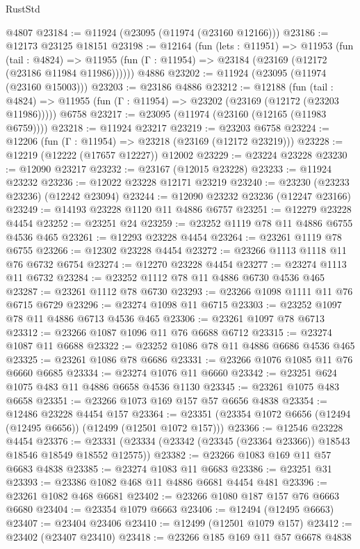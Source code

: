 \begin{lexlean}{RustStd}
\begin{coremodule}
{\begin{coremodule}
{{{{{{{{{{{{{{{{{{{{{{{{{{{{{{{{{{{{{{{{{{{{{{{{{{{{{{{{{{{{{{{{{{{{{{{{{{{{{{{{    @4807
@23184 := @11924 (@23095 (@11974 (@23160 @12166)))
@23186 := @12173 @23125 @18151
@23198 := @12164
    (fun (lets : @11951) =>
    @11953
      (fun (tail : @4824) =>
      @11955 (fun (Γ : @11954) => @23184 (@23169 (@12172 (@23186 @11984 @11986))))))
    @4886
@23202 := @11924 (@23095 (@11974 (@23160 @15003)))
@23203 := @23186 @4886
@23212 := @12188
    (fun (tail : @4824) => @11955 (fun (Γ : @11954) => @23202 (@23169 (@12172 (@23203 @11986)))))
    @6758
@23217 := @23095 (@11974 (@23160 (@12165 (@11983 @6759))))
@23218 := @11924 @23217
@23219 := @23203 @6758
@23224 := @12206 (fun (Γ : @11954) => @23218 (@23169 (@12172 @23219)))
@23228 := @12219 (@12222 (@17657 @12227)) @12002
@23229 := @23224 @23228
@23230 := @12090 @23217
@23232 := @23167 (@12015 @23228)
@23233 := @11924 @23232
@23236 := @12022 @23228 @12171 @23219
@23240 := @23230 (@23233 @23236) (@12242 @23094)
@23244 := @12090 @23232 @23236 (@12247 @23166)
@23249 := @14193 @23228 @1120 @11 @4886 @6757
@23251 := @12279 @23228 @4454
@23252 := @23251 @24
@23259 := @23252 @1119 @78 @11 @4886 @6755 @4536 @465
@23261 := @12293 @23228 @4454
@23264 := @23261 @1119 @78 @6755
@23266 := @12302 @23228 @4454
@23272 := @23266 @1113 @1118 @11 @76 @6732 @6754
@23274 := @12270 @23228 @4454
@23277 := @23274 @1113 @11 @6732
@23284 := @23252 @1112 @78 @11 @4886 @6730 @4536 @465
@23287 := @23261 @1112 @78 @6730
@23293 := @23266 @1098 @1111 @11 @76 @6715 @6729
@23296 := @23274 @1098 @11 @6715
@23303 := @23252 @1097 @78 @11 @4886 @6713 @4536 @465
@23306 := @23261 @1097 @78 @6713
@23312 := @23266 @1087 @1096 @11 @76 @6688 @6712
@23315 := @23274 @1087 @11 @6688
@23322 := @23252 @1086 @78 @11 @4886 @6686 @4536 @465
@23325 := @23261 @1086 @78 @6686
@23331 := @23266 @1076 @1085 @11 @76 @6660 @6685
@23334 := @23274 @1076 @11 @6660
@23342 := @23251 @624 @1075 @483 @11 @4886 @6658 @4536 @1130
@23345 := @23261 @1075 @483 @6658
@23351 := @23266 @1073 @169 @157 @57 @6656 @4838
@23354 := @12486 @23228 @4454 @157
@23364 := @23351 (@23354 @1072 @6656 (@12494 (@12495 @6656)) (@12499 (@12501 @1072 @157)))
@23366 := @12546 @23228 @4454
@23376 := @23331 (@23334 (@23342 (@23345 (@23364 @23366)) @18543 @18546 @18549 @18552 @12575))
@23382 := @23266 @1083 @169 @11 @57 @6683 @4838
@23385 := @23274 @1083 @11 @6683
@23386 := @23251 @31
@23393 := @23386 @1082 @468 @11 @4886 @6681 @4454 @481
@23396 := @23261 @1082 @468 @6681
@23402 := @23266 @1080 @187 @157 @76 @6663 @6680
@23404 := @23354 @1079 @6663
@23406 := @12494 (@12495 @6663)
@23407 := @23404 @23406
@23410 := @12499 (@12501 @1079 @157)
@23412 := @23402 (@23407 @23410)
@23418 := @23266 @185 @169 @11 @57 @6678 @4838
}}}}}}}}}}}}}}}}}}}}}}}}}}}}}}}}}}}}}}}}}}}}}}}}}}}}}}}}}}}}}}}}}}}}}}}}}}}}}}}}
\end{coremodule}}
\end{coremodule}
\end{lexlean}
